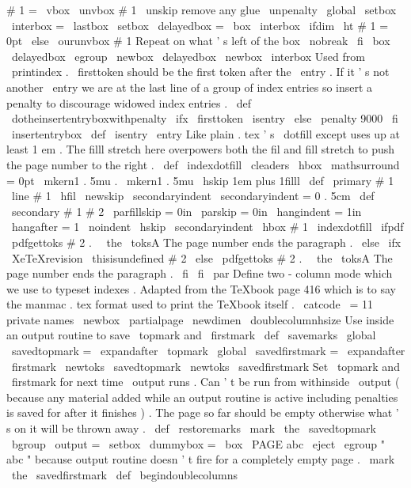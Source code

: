 {{{{#
1
=
\
vbox
{
%
\
unvbox
#
1
%
\
unskip
%
remove
any
glue
\
unpenalty
\
global
\
setbox
\
interbox
=
\
lastbox
}
%
\
setbox
\
delayedbox
=
\
box
\
interbox
\
ifdim
\
ht
#
1
=
0pt
\
else
\
ourunvbox
#
1
%
Repeat
on
what
'
s
left
of
the
box
\
nobreak
\
fi
\
box
\
delayedbox
\
egroup
}
\
newbox
\
delayedbox
\
newbox
\
interbox
%
Used
from
\
printindex
.
\
firsttoken
should
be
the
first
token
%
after
the
\
entry
.
If
it
'
s
not
another
\
entry
we
are
at
the
last
%
line
of
a
group
of
index
entries
so
insert
a
penalty
to
discourage
%
widowed
index
entries
.
\
def
\
dotheinsertentryboxwithpenalty
{
%
\
ifx
\
firsttoken
\
isentry
\
else
\
penalty
9000
\
fi
\
insertentrybox
}
\
def
\
isentry
{
\
entry
}
%
%
Like
plain
.
tex
'
s
\
dotfill
except
uses
up
at
least
1
em
.
%
The
filll
stretch
here
overpowers
both
the
fil
and
fill
stretch
to
push
%
the
page
number
to
the
right
.
\
def
\
indexdotfill
{
\
cleaders
\
hbox
{
\
mathsurround
=
0pt
\
mkern1
.
5mu
.
\
mkern1
.
5mu
}
\
hskip
1em
plus
1filll
}
\
def
\
primary
#
1
{
\
line
{
#
1
\
hfil
}
}
\
newskip
\
secondaryindent
\
secondaryindent
=
0
.
5cm
\
def
\
secondary
#
1
#
2
{
{
%
\
parfillskip
=
0in
\
parskip
=
0in
\
hangindent
=
1in
\
hangafter
=
1
\
noindent
\
hskip
\
secondaryindent
\
hbox
{
#
1
}
\
indexdotfill
\
ifpdf
\
pdfgettoks
#
2
.
\
\
the
\
toksA
%
The
page
number
ends
the
paragraph
.
\
else
\
ifx
\
XeTeXrevision
\
thisisundefined
#
2
\
else
\
pdfgettoks
#
2
.
\
\
the
\
toksA
%
The
page
number
ends
the
paragraph
.
\
fi
\
fi
\
par
}
}
%
Define
two
-
column
mode
which
we
use
to
typeset
indexes
.
%
Adapted
from
the
TeXbook
page
416
which
is
to
say
%
the
manmac
.
tex
format
used
to
print
the
TeXbook
itself
.
\
catcode
\
=
11
%
private
names
\
newbox
\
partialpage
\
newdimen
\
doublecolumnhsize
%
Use
inside
an
output
routine
to
save
\
topmark
and
\
firstmark
\
def
\
savemarks
{
%
\
global
\
savedtopmark
=
\
expandafter
{
\
topmark
}
%
\
global
\
savedfirstmark
=
\
expandafter
{
\
firstmark
}
%
}
\
newtoks
\
savedtopmark
\
newtoks
\
savedfirstmark
%
Set
\
topmark
and
\
firstmark
for
next
time
\
output
runs
.
%
Can
'
t
be
run
from
withinside
\
output
(
because
any
material
%
added
while
an
output
routine
is
active
including
%
penalties
is
saved
for
after
it
finishes
)
.
The
page
so
far
%
should
be
empty
otherwise
what
'
s
on
it
will
be
thrown
away
.
\
def
\
restoremarks
{
%
\
mark
{
\
the
\
savedtopmark
}
%
\
bgroup
\
output
=
{
%
\
setbox
\
dummybox
=
\
box
\
PAGE
}
abc
\
eject
\
egroup
%
"
abc
"
because
output
routine
doesn
'
t
fire
for
a
completely
empty
page
.
\
mark
{
\
the
\
savedfirstmark
}
%
}
\
def
\
begindoublecolumns
}}}

